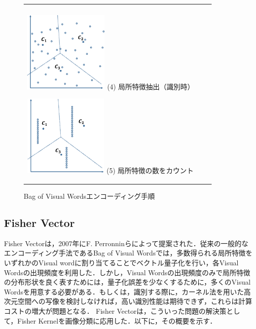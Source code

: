 \begin{figure}[htbp]
\begin{tabular}{ccc}
\begin{minipage}{0.33\textwidth}
 \end{minipage} \\
%
 \begin{minipage}{0.33\textwidth}
  \begin{center}
   \includegraphics[height=40mm]{figure/bovw_4.eps}
   \hspace{1.6cm} (4) 局所特徴抽出（識別時）
  \end{center}
 \end{minipage}
%
 \begin{minipage}{0.33\textwidth}
  \begin{center}
   \includegraphics[height=40mm]{figure/bovw_5.eps}
   \hspace{1.6cm} (5) 局所特徴の数をカウント
  \end{center}
 \end{minipage}
%
\end{tabular}
\caption{Bag of Visual Wordsエンコーディング手順}
\label{fig:bag_of_visual_words}
\end{figure}
%
\newpage
%
\subsection{Fisher Vector}
Fisher Vectorは，2007年にF. Perronninらによって提案された\cite{fisher_vector}．従来の一般的なエンコーディング手法であるBag of Visual Wordsでは，多数得られる局所特徴をいずれかのVisual wordに割り当てることでベクトル量子化を行い，各Visual Wordsの出現頻度を利用した．しかし，Visual Wordsの出現頻度のみで局所特徴の分布形状を良く表すためには，量子化誤差を少なくするために，多くのVisual Wordsを用意する必要がある．もしくは，識別する際に，カーネル法を用いた高次元空間への写像を検討しなければ，高い識別性能は期待できず，これらは計算コストの増大が問題となる．
Fisher Vectorは，こういった問題の解決策として，Fisher Kernel\cite{fisher_vector2}を画像分類に応用した．以下に，その概要を示す．

